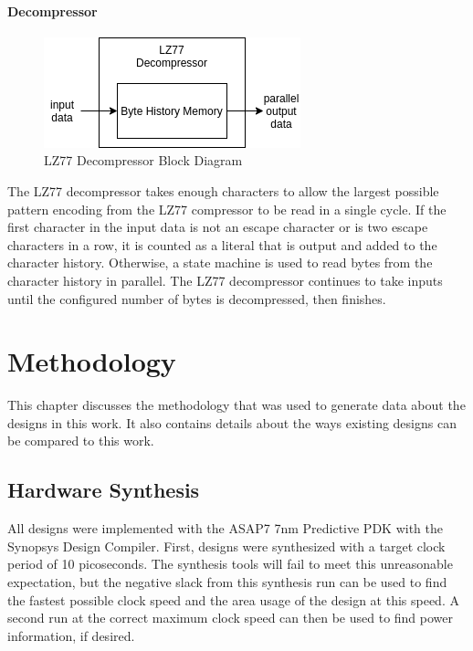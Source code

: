 \documentclass[doublespace,nopageskip]{VTthesis}
\begin{document}
\subsubsection{Decompressor}\label{sss:lz77_decompressor_implementation}

\begin{figure}[htb]
	\centering
	\includegraphics[scale=1]{LZ77 Decompressor.png}
	\caption{LZ77 Decompressor Block Diagram}
	\label{fig:lz77_decompressor_block_diagram}
\end{figure}

The LZ77 decompressor takes enough characters to allow the largest possible pattern encoding from the LZ77 compressor to be read in a single cycle. If the first character in the input data is not an escape character or is two escape characters in a row, it is counted as a literal that is output and added to the character history. Otherwise, a state machine is used to read bytes from the character history in parallel. The LZ77 decompressor continues to take inputs until the configured number of bytes is decompressed, then finishes.

\chapter{Methodology} \label{ch:methodology}
This chapter discusses the methodology that was used to generate data about the designs in this work. It also contains details about the ways existing designs can be compared to this work.

\section{Hardware Synthesis}\label{se:hardware_synthesis}
All designs were implemented with the ASAP7 7nm Predictive PDK with the Synopsys Design Compiler. First, designs were synthesized with a target clock period of 10 picoseconds. The synthesis tools will fail to meet this unreasonable expectation, but the negative slack from this synthesis run can be used to find the fastest possible clock speed and the area usage of the design at this speed. A second run at the correct maximum clock speed can then be used to find power information, if desired.
\end{document}
